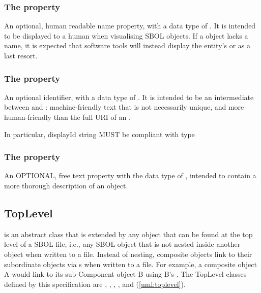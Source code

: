 \subsubsection*{The  property}
\label{sec:name}
An optional, human readable name property, with a data type of . It is intended to be displayed to a human when visualising SBOL objects.  
If a  object lacks a name, it is expected that software tools will instead display the entity's  or  as a last resort.

\subsubsection*{The  property}
\label{sec:displayId}
An optional identifier, with a data type of . It is intended to be an intermediate between  and : machine-friendly text that is not necessarily unique, and more human-friendly than the full URI of an .

In particular, displayId string MUST be compliant with type 


\subsubsection*{The  property}
\label{sec:description}
An OPTIONAL, free text property with the data type of , intended to contain a more thorough description of an object.


\subsection {TopLevel}
\label{sec:TopLevel}
 is an abstract class that is extended by any  object that can be found at the top level of a SBOL file, i.e., any SBOL object that is not nested inside another object when written to a file. Instead of nesting, composite  objects link to their subordinate  objects via s when written to a file. For example, a composite  object A would link to its sub-Component object B using B's . The TopLevel classes defined by this specification are , , , ,  and  (\ref{uml:toplevel}).

